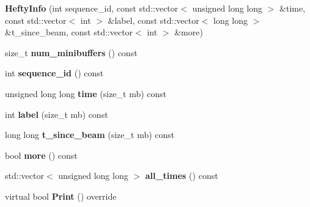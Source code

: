 \begin{DoxyCompactItemize}
\item 
\hypertarget{classHeftyInfo_af721faddd429a02ea7651108185ec478}{{\bfseries Hefty\-Info} (int sequence\-\_\-id, const std\-::vector$<$ unsigned long long $>$ \&time, const std\-::vector$<$ int $>$ \&label, const std\-::vector$<$ long long $>$ \&t\-\_\-since\-\_\-beam, const std\-::vector$<$ int $>$ \&more)}\label{classHeftyInfo_af721faddd429a02ea7651108185ec478}

\item 
\hypertarget{classHeftyInfo_a1e9b9d3197a8df5bff0432f1f814109b}{size\-\_\-t {\bfseries num\-\_\-minibuffers} () const }\label{classHeftyInfo_a1e9b9d3197a8df5bff0432f1f814109b}

\item 
\hypertarget{classHeftyInfo_ab9b5565e7b54b73eb83fd72c3e10a349}{int {\bfseries sequence\-\_\-id} () const }\label{classHeftyInfo_ab9b5565e7b54b73eb83fd72c3e10a349}

\item 
\hypertarget{classHeftyInfo_a9da6b668891f3a104f5fe6b5026e0969}{unsigned long long {\bfseries time} (size\-\_\-t mb) const }\label{classHeftyInfo_a9da6b668891f3a104f5fe6b5026e0969}

\item 
\hypertarget{classHeftyInfo_a2455de20fa2e072b68f58f37307c1989}{int {\bfseries label} (size\-\_\-t mb) const }\label{classHeftyInfo_a2455de20fa2e072b68f58f37307c1989}

\item 
\hypertarget{classHeftyInfo_a6880deb111e4b3f3d1d0bf0be8e4290e}{long long {\bfseries t\-\_\-since\-\_\-beam} (size\-\_\-t mb) const }\label{classHeftyInfo_a6880deb111e4b3f3d1d0bf0be8e4290e}

\item 
\hypertarget{classHeftyInfo_abb3cfed8ce0e9d03024d62a5687746cc}{bool {\bfseries more} () const }\label{classHeftyInfo_abb3cfed8ce0e9d03024d62a5687746cc}

\item 
\hypertarget{classHeftyInfo_a9f6297619ba660d09a294ad599d3273e}{std\-::vector$<$ unsigned long long $>$ {\bfseries all\-\_\-times} () const }\label{classHeftyInfo_a9f6297619ba660d09a294ad599d3273e}

\item 
\hypertarget{classHeftyInfo_a4184a22ba444cbfcc94b95bc5b0df49b}{virtual bool {\bfseries Print} () override}\label{classHeftyInfo_a4184a22ba444cbfcc94b95bc5b0df49b}

\end{DoxyCompactItemize}
